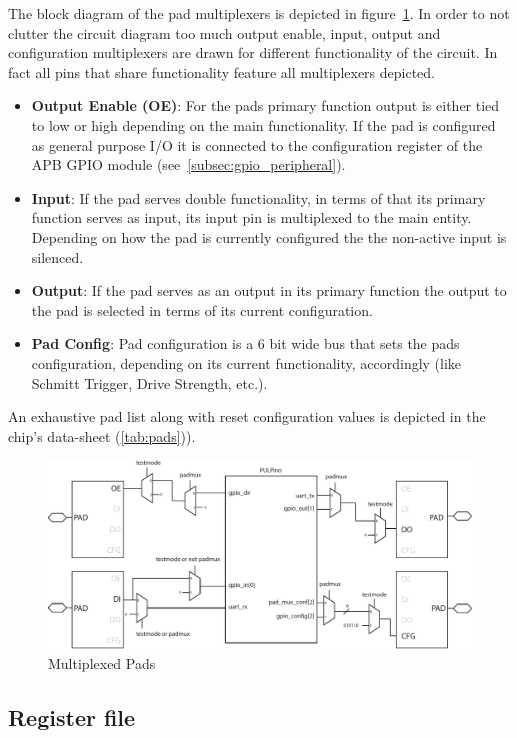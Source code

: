 The block diagram of the pad multiplexers is depicted in figure~\ref{fig:pad_muxes}. In order to not clutter the circuit diagram too much output enable, input, output and configuration multiplexers are drawn for different functionality of the circuit. In fact all pins that share functionality feature all multiplexers depicted.
\begin{itemize}
    \item \textbf{Output Enable (OE)}: For the pads primary function output is either tied to low or high depending on the main functionality. If the pad is configured as general purpose I/O it is connected to the configuration register of the APB GPIO module (see~\ref{subsec:gpio_peripheral}).
    \item \textbf{Input}: If the pad serves double functionality, in terms of that its primary function serves as input, its input pin is multiplexed to the main entity. Depending on how the pad is currently configured the the non-active input is silenced.
    \item \textbf{Output}: If the pad serves as an output in its primary function the output to the pad is selected in terms of its current configuration.
    \item \textbf{Pad Config}: Pad configuration is a 6 bit wide bus that sets the pads configuration, depending on its current functionality, accordingly (like Schmitt Trigger, Drive Strength, etc.).
\end{itemize}
An exhaustive pad list along with reset configuration values is depicted in the chip's data-sheet (\ref{tab:pads})).


\begin{figure}[tbh]
  \centering
  \includegraphics[width=\linewidth]{./figures/pad_muxes}
  \caption{Multiplexed Pads}
  \label{fig:pad_muxes}
\end{figure}

\subsection{Register file}

